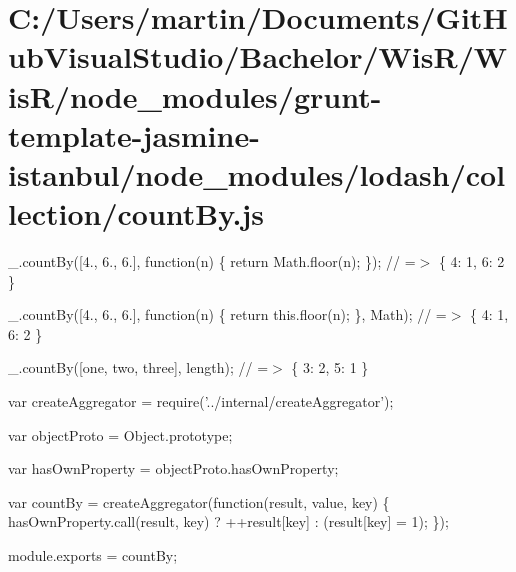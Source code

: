 \hypertarget{_c_1_2_users_2martin_2_documents_2_git_hub_visual_studio_2_bachelor_2_wis_r_2_wis_r_2node_module12bdd52de042467a472426aa687c65d3}{}\section{C\+:/\+Users/martin/\+Documents/\+Git\+Hub\+Visual\+Studio/\+Bachelor/\+Wis\+R/\+Wis\+R/node\+\_\+modules/grunt-\/template-\/jasmine-\/istanbul/node\+\_\+modules/lodash/collection/count\+By.\+js}
\+\_\+.\+count\+By(\mbox{[}4., 6., 6.\mbox{]}, function(n) \{ return Math.\+floor(n); \}); // =$>$ \{ \textquotesingle{}4\textquotesingle{}\+: 1, \textquotesingle{}6\textquotesingle{}\+: 2 \}

\+\_\+.\+count\+By(\mbox{[}4., 6., 6.\mbox{]}, function(n) \{ return this.\+floor(n); \}, Math); // =$>$ \{ \textquotesingle{}4\textquotesingle{}\+: 1, \textquotesingle{}6\textquotesingle{}\+: 2 \}

\+\_\+.\+count\+By(\mbox{[}\textquotesingle{}one\textquotesingle{}, \textquotesingle{}two\textquotesingle{}, \textquotesingle{}three\textquotesingle{}\mbox{]}, \textquotesingle{}length\textquotesingle{}); // =$>$ \{ \textquotesingle{}3\textquotesingle{}\+: 2, \textquotesingle{}5\textquotesingle{}\+: 1 \}


\begin{DoxyCodeInclude}
var createAggregator = require(\textcolor{stringliteral}{'../internal/createAggregator'});

var objectProto = Object.prototype;

var hasOwnProperty = objectProto.hasOwnProperty;

var countBy = createAggregator(\textcolor{keyword}{function}(result, value, key) \{
  hasOwnProperty.call(result, key) ? ++result[key] : (result[key] = 1);
\});

module.exports = countBy;
\end{DoxyCodeInclude}
 